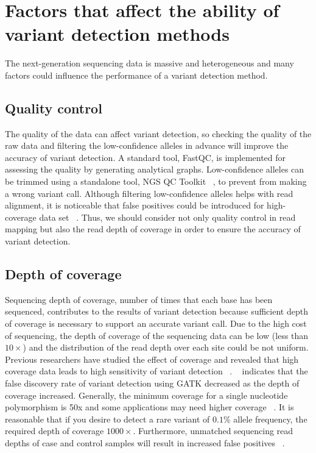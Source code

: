 \documentclass[11pt,reqno]{amsart}
\begin{document}
\section{Factors that affect the ability of variant detection methods}

The next-generation sequencing data is massive and heterogeneous and many factors could influence the performance of a variant detection method.
\subsection{Quality control}

The quality of the data can affect variant detection, so checking the quality of the raw data and filtering the low-confidence alleles in advance will improve the accuracy of variant detection.
A standard tool, FastQC, is implemented for assessing the quality by generating analytical graphs.
Low-confidence alleles can be trimmed using a standalone tool, NGS QC Toolkit ~\citep{patel2012ngs}, to prevent from making a wrong variant call.
Although filtering low-confidence alleles helps with read alignment, it is noticeable that false positives could be introduced for high-coverage data set ~\citep{liu2012steps}.
Thus, we should consider not only quality control in read mapping but also the read depth of coverage in order to ensure the accuracy of variant detection.

\subsection{Depth of coverage}

Sequencing depth of coverage, number of times that each base has been sequenced, contributes to the results of variant detection because sufficient depth of coverage is necessary to support an accurate variant call.
Due to the high cost of sequencing, the depth of coverage of the sequencing data can be low (less than $10\times$) and the distribution of the read depth over each site could be not uniform.
Previous researchers have studied the effect of coverage and revealed that high coverage data leads to high sensitivity of variant detection ~\citep{neuman2013analysis, krawitz2010microindel}.
~\citep{liu2013variant} indicates that the false discovery rate of variant detection using GATK decreased as the depth of coverage increased.
Generally, the minimum coverage for a single nucleotide polymorphism is 50x and some applications may need higher coverage ~\citep{Schlotterer2014}.
It is reasonable that if you desire to detect a rare variant of $0.1 \%$ allele frequency, the required depth of coverage $1000\times$.
Furthermore, unmatched sequencing read depths of case and control samples will result in increased false positives ~\citep{garner2011confounded}.
\end{document}
